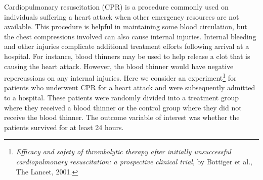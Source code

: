 
Cardiopulmonary resuscitation (CPR) is a procedure commonly used on individuals suffering a heart attack when other emergency resources are not available. This procedure is helpful in maintaining some blood circulation, but the chest compressions involved can also cause internal injuries. Internal bleeding and other injuries complicate additional treatment efforts following arrival at a hospital. For instance, blood thinners may be used to help release a clot that is causing the heart attack. However, the blood thinner would have negative repercussions on any internal injuries. Here we consider an experiment\footnote{\emph{Efficacy and safety of thrombolytic therapy after initially unsuccessful cardiopulmonary resuscitation: a prospective clinical trial}, by B$\ddot{\text{o}}$ttiger et al., The Lancet, 2001.} for patients who underwent CPR for a heart attack and were subsequently admitted to a hospital. These patients were randomly divided into a treatment group where they received a blood thinner or the control group where they did not receive the blood thinner. The outcome variable of interest was whether the patients survived for at least 24 hours.

